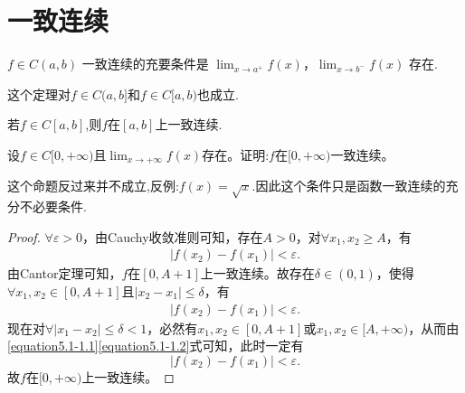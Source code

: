 \documentclass[../../main.tex]{subfiles}
\begin{document}
\section{一致连续}

\begin{theorem}[Cantor定理]\label{theorem:Cantor定理}
\(f\in C(a,b)\) 一致连续的充要条件是 \(\lim_{x\rightarrow a^{+}}f(x)\)，\(\lim_{x\rightarrow b^{-}}f(x)\) 存在.
\end{theorem}
\begin{remark}
这个定理对$f\in C(a,b]$和$f\in C[a,b)$也成立.
\end{remark}

\begin{corollary}\label{corollary:闭区间上的连续函数一定一致连续.}
若$f\in C[a,b]$,则$f$在$[a,b]$上一致连续.
\end{corollary}

\begin{proposition}\label{proposition一致连续的充分不必要条件}
设\(f\in C[0,+\infty)\)且\(\lim_{x\rightarrow +\infty}f(x)\)存在。证明:\(f\)在\([0,+\infty)\)一致连续。
\end{proposition}
\begin{remark}
这个命题反过来并不成立,反例:$f(x)=\sqrt{x}$.因此这个条件只是函数一致连续的充分不必要条件.
\end{remark}
\begin{proof}
\(\forall \varepsilon > 0\)，由Cauchy收敛准则可知，存在\(A > 0\)，对\(\forall x_1, x_2 \geqslant A\)，有
\begin{align}
\left| f(x_2) - f(x_1) \right| < \varepsilon.  \label{equation5.1-1.1}
\end{align}
由Cantor定理可知，\(f\)在\([0, A + 1]\)上一致连续。故存在\(\delta \in (0, 1)\)，使得\(\forall x_1, x_2 \in [0, A + 1]\)且\(\left| x_2 - x_1 \right| \leqslant \delta\)，有
\begin{align}
\left| f(x_2) - f(x_1) \right| < \varepsilon.\label{equation5.1-1.2}
\end{align}
现在对\(\forall \left| x_1 - x_2 \right| \leqslant \delta < 1\)，必然有\(x_1, x_2 \in [0, A + 1]\)或\(x_1, x_2 \in [A, +\infty)\)，从而由\eqref{equation5.1-1.1}\eqref{equation5.1-1.2}式可知，此时一定有
\[
\left| f(x_2) - f(x_1) \right| < \varepsilon.
\]
故\(f\)在\([0, +\infty)\)上一致连续。
\end{proof}
\end{document}
